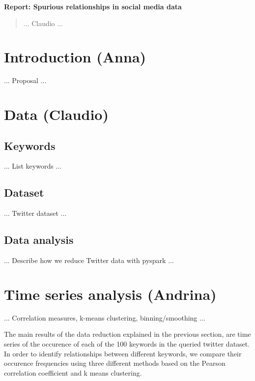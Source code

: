 \documentclass[12pt, a4paper]{article}
\begin{document}
\textbf{Report: Spurious relationships in social media data}

\begin{abstract}
... Claudio ...
\end{abstract}


\vspace{0.2in}

\section{Introduction (Anna)}
... Proposal ...


\section{Data (Claudio)}
\subsection{Keywords}
... List keywords ...

\subsection{Dataset}
... Twitter dataset ...

\subsection{Data analysis}
... Describe how we reduce Twitter data with pyspark ...


\section{Time series analysis (Andrina)}
... Correlation measures, k-means clustering, binning/smoothing ...

The main results of the data reduction explained in the previous section, are time series of the occurence of each of the 100 keywords in the queried twitter dataset. In order to identify relationships between different keywords, we compare their occurence frequencies using three different methods based on the Pearson correlation coefficient and k means clustering. 
\end{document}
